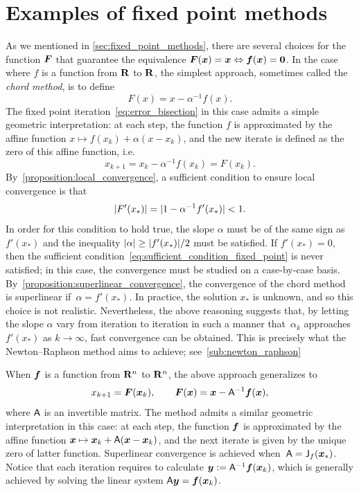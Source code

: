 \section{Examples of fixed point methods}
\label{sec:examples_of_fixed_point_methods}
As we mentioned in \cref{sec:fixed_point_methods},
there are several choices for the function $\mathbf{\boldsymbol{F}}$ that guarantee
the equivalence $\mathbf{\boldsymbol{F}}(\mathbf{\boldsymbol{x}}) = \mathbf{\boldsymbol{x}} \Leftrightarrow \mathbf{\boldsymbol{f}}(\mathbf{\boldsymbol{x}}) = \mathbf{\boldsymbol{0}}$.
In the case where $f$ is a function from $\mathbf R$ to $\mathbf R$,
the simplest approach, sometimes called the \emph{chord method}, is to define
\[
    F(x) = x - \alpha^{-1} f(x).
\]
The fixed point iteration~\eqref{eq:error_bisection} in this case admits a simple geometric interpretation:
at each step, the function $f$ is approximated by the affine function $x \mapsto f(x_k) + \alpha (x - x_k)$,
and the new iterate is defined as the zero of this affine function,
i.e.
\begin{equation}
    \label{eq:naive_fixed_point}
    x_{k+1} = x_k - \alpha^{-1} f(x_k) = F(x_k).
\end{equation}
By~\cref{proposition:local_convergence},
a sufficient condition to ensure local convergence is that
\begin{equation}
    \label{eq:sufficient_condition_fixed_point}
    \lvert F'(x_*)\rvert = \lvert1 - \alpha^{-1} f'(x_*)\rvert < 1.
\end{equation}
In order for this condition to hold true,
the slope $\alpha$ must be of the same sign as $f'(x_*)$
and the inequality $\lvert\alpha\rvert \geq \lvert f'(x_*)\rvert/2$ must be satisfied.
If $f'(x_*) = 0$,
then the sufficient condition~\eqref{eq:sufficient_condition_fixed_point} is never satisfied;
in this case, the convergence must be studied on a case-by-case basis.
By~\cref{proposition:superlinear_convergence},
the convergence of the chord method is superlinear if~$\alpha = f'(x_*)$.
In practice, the solution $x_*$ is unknown,
and so this choice is not realistic.
Nevertheless, the above reasoning suggests that, by letting the slope $\alpha$ vary from iteration to iteration in such a manner that~$\alpha_k$ approaches $f'(x_*)$ as $k \to \infty$,
fast convergence can be obtained.
This is precisely what the Newton--Raphson method aims to achieve;
see~\cref{sub:newton_raphson}

When $\mathbf{\boldsymbol{f}}$ is a function from $\mathbf R^n$ to $\mathbf R^n$,
the above approach generalizes to
\[
    x_{k+1} = \mathbf{\boldsymbol{F}}(\mathbf{\boldsymbol{x}}_k), \qquad
    \mathbf{\boldsymbol{F}}(\mathbf{\boldsymbol{x}}) = \mathbf{\boldsymbol{x}} - \mathsf A^{-1} \mathbf{\boldsymbol{f}}(\mathbf{\boldsymbol{x}}),
\]
where $\mathsf A$ is an invertible matrix.
The method admits a similar geometric interpretation in this case:
at each step, the function $\mathbf{\boldsymbol{f}}$ is approximated by the affine function
$\mathbf{\boldsymbol{x}} \mapsto \mathbf{\boldsymbol{x}}_k + \mathsf A(\mathbf{\boldsymbol{x}} - \mathbf{\boldsymbol{x}}_k)$,
and the next iterate is given by the unique zero of latter function.
Superlinear convergence is achieved when~$\mathsf A = \mathsf J_f(\mathbf{\boldsymbol{x}}_*)$.
Notice that each iteration requires to calculate $\mathbf{\boldsymbol{y}} := \mathsf A^{-1} \mathbf{\boldsymbol{f}}(\mathbf{\boldsymbol{x}}_k)$,
which is generally achieved by solving the linear system $\mathsf A \mathbf{\boldsymbol{y}} = \mathbf{\boldsymbol{f}}(\mathbf{\boldsymbol{x}}_k)$.


